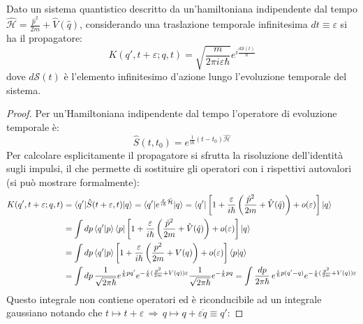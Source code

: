 \begin{proposition}
	Dato un sistema quantistico descritto da un'hamiltoniana indipendente dal tempo $ \hat{\mathcal{H}} = \frac{\hat{p}^2}{2m} + \hat{V}(\hat{q}) $, considerando una traslazione temporale infinitesima $ dt \equiv \varepsilon $ si ha il propagatore:
	\begin{equation}
		K(q',t + \varepsilon ; q,t) = \sqrt{\frac{m}{2\pi i \varepsilon \hbar}} e^{i \frac{d\mathcal{S}(t)}{\hbar}}
		\label{eq:4.16}
	\end{equation}
	dove $ d\mathcal{S}(t) $ è l'elemento infinitesimo d'azione lungo l'evoluzione temporale del sistema.
\end{proposition}
\begin{proof}
	Per un'Hamiltoniana indipendente dal tempo l'operatore di evoluzione temporale è:
	\begin{equation*}
		\hat{S}(t,t_0) = e^{\frac{1}{i\hbar} (t - t_0) \hat{\mathcal{H}}}
	\end{equation*}
	Per calcolare esplicitamente il propagatore si sfrutta la risoluzione dell'identità sugli impulsi, il che permette di sostituire gli operatori con i rispettivi autovalori (si può mostrare formalmente):
	\begin{equation*}
		\begin{split}
			K(q',t+\varepsilon ; q,t)
			&= \braket{q' | \hat{S}(t+\varepsilon,t) | q} = \braket{q' | e^{\frac{\varepsilon}{i\hbar} \hat{\mathcal{H}}} | q} = \braket{q' | \left[ 1 + \frac{\varepsilon}{i\hbar} \left( \frac{\hat{p}^2}{2m} + \hat{V}(\hat{q}) \right) + o(\varepsilon) \right] | q} \\
			&= \int dp \braket{q' | p} \braket{p | \left[ 1 + \frac{\varepsilon}{i\hbar} \left( \frac{\hat{p}^2}{2m} + \hat{V}(\hat{q}) \right) + o(\varepsilon) \right] | q} \\
			&= \int dp \braket{q' | p} \left[ 1 + \frac{\varepsilon}{i\hbar} \left( \frac{p^2}{2m} + V(q) \right) + o(\varepsilon) \right] \braket{p | q} \\
			&= \int dp\, \frac{1}{\sqrt{2\pi\hbar}} e^{\frac{i}{\hbar} p q'} e^{- \frac{i}{\hbar} ( \frac{p^2}{2m} + V(q) ) \varepsilon} \frac{1}{\sqrt{2\pi\hbar}} e^{ - \frac{i}{\hbar} pq} = \int \frac{dp}{2\pi\hbar}\, e^{\frac{i}{\hbar} p (q' - q)} e^{- \frac{i}{\hbar} ( \frac{p^2}{2m} + V(q) ) \varepsilon}
		\end{split}
	\end{equation*}
	Questo integrale non contiene operatori ed è riconducibile ad un integrale gaussiano notando che $ t \mapsto t + \varepsilon \,\Rightarrow\, q \mapsto q + \varepsilon \dot{q} \equiv q' $:

\end{proof}
